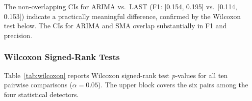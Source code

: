 \documentclass[pdflatex,sn-nature]{sn-jnl}
\theoremstyle{thmstyleone}%
\begin{document}
\begin{table}[tbp]
\centering
{}
\caption{Bootstrap 95\% confidence intervals (2,000 resamples) on the
  calibration-baseline (214-signature, 70\%/30\%) per-signature scores.}
\label{tab:bootstrap_ci}
\end{table}

The non-overlapping CIs for ARIMA vs.\ LAST (F1: [0.154, 0.195]
vs.\ [0.114, 0.153]) indicate a practically meaningful difference, confirmed
by the Wilcoxon test below.
The CIs for ARIMA and SMA overlap substantially in F1 and precision.

\subsubsection{Wilcoxon Signed-Rank Tests}

Table~\ref{tab:wilcoxon} reports Wilcoxon signed-rank test $p$-values for
all ten pairwise comparisons ($\alpha = 0.05$).
The upper block covers the six pairs among the four statistical detectors.

\begin{table}[tbp]
\centering
{}
\caption{Wilcoxon signed-rank test $p$-values ($n = 214$, calibration baseline)
  for all six pairwise comparisons among the four statistical detectors.
  Cells with $^{*}$ are \emph{not statistically significant} ($p \geq 0.05$).}
\label{tab:wilcoxon}
\end{table}
\end{document}
